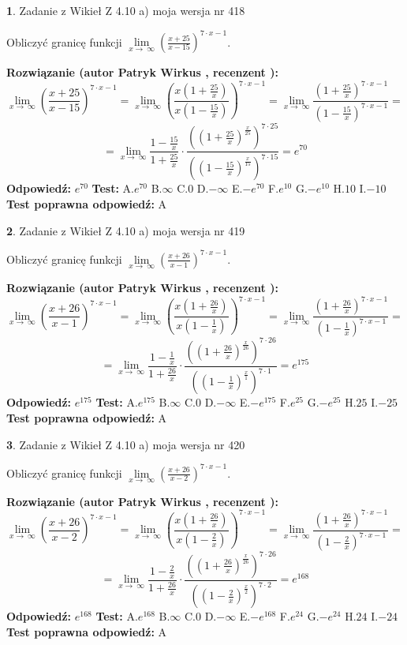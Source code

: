 \documentclass[12pt, a4paper]{article}
\theoremstyle{definition} %
\newtheorem{zad}{}
\newcommand{\zadStart}[1]{\begin{zad}#1\newline}
\newcommand{\zadStop}{\end{zad}}
\newcommand{\rozwStart}[2]{\noindent \textbf{Rozwiązanie (autor #1 , recenzent #2): }\newline}
\newcommand{\rozwStop}{\newline}
\newcommand{\odpStart}{\noindent \textbf{Odpowiedź:}\newline}
\newcommand{\odpStop}{\newline}
\newcommand{\testStart}{\noindent \textbf{Test:}\newline}
\newcommand{\testStop}{\newline}
\newcommand{\kluczStart}{\noindent \textbf{Test poprawna odpowiedź:}\newline}
\newcommand{\kluczStop}{\newline}
\begin{document}
\zadStart{Zadanie z Wikieł Z 4.10 a) moja wersja nr 418}

Obliczyć granicę funkcji  $\lim\limits_{x\to\ \infty}(\frac{x+25}{x-15})^{7\cdot x-1}$.
\zadStop
\rozwStart{Patryk Wirkus}{}
$$\lim\limits_{x\to\ \infty}(\frac{x+25}{x-15})^{7\cdot x-1} = \lim\limits_{x\to\ \infty}(\frac{x(1+\frac{25}{x})}{x(1-\frac{15}{x})})^{7\cdot x-1}=\lim\limits_{x\to\ \infty}\frac{(1+\frac{25}{x})^{7\cdot x-1}}{(1-\frac{15}{x})^{7\cdot x-1}}=$$
$$=\lim\limits_{x\to\ \infty}\frac{1-\frac{15}{x}}{1+\frac{25}{x}}\cdot\frac{((1+\frac{25}{x})^{\frac{x}{25}})^{7\cdot25}}{((1-\frac{15}{x})^{\frac{x}{15}})^{7\cdot15}}=e^{70}$$
\rozwStop
\odpStart
$e^{70}$
\odpStop
\testStart
A.$e^{70}$ B.$\infty$ C.$0$ D.$-\infty$ E.$-e^{70}$
F.$e^{10}$ G.$-e^{10}$
H.$10$
I.$-10$
\testStop
\kluczStart
A
\kluczStop



\zadStart{Zadanie z Wikieł Z 4.10 a) moja wersja nr 419}

Obliczyć granicę funkcji  $\lim\limits_{x\to\ \infty}(\frac{x+26}{x-1})^{7\cdot x-1}$.
\zadStop
\rozwStart{Patryk Wirkus}{}
$$\lim\limits_{x\to\ \infty}(\frac{x+26}{x-1})^{7\cdot x-1} = \lim\limits_{x\to\ \infty}(\frac{x(1+\frac{26}{x})}{x(1-\frac{1}{x})})^{7\cdot x-1}=\lim\limits_{x\to\ \infty}\frac{(1+\frac{26}{x})^{7\cdot x-1}}{(1-\frac{1}{x})^{7\cdot x-1}}=$$
$$=\lim\limits_{x\to\ \infty}\frac{1-\frac{1}{x}}{1+\frac{26}{x}}\cdot\frac{((1+\frac{26}{x})^{\frac{x}{26}})^{7\cdot26}}{((1-\frac{1}{x})^{\frac{x}{1}})^{7\cdot1}}=e^{175}$$
\rozwStop
\odpStart
$e^{175}$
\odpStop
\testStart
A.$e^{175}$ B.$\infty$ C.$0$ D.$-\infty$ E.$-e^{175}$
F.$e^{25}$ G.$-e^{25}$
H.$25$
I.$-25$
\testStop
\kluczStart
A
\kluczStop



\zadStart{Zadanie z Wikieł Z 4.10 a) moja wersja nr 420}

Obliczyć granicę funkcji  $\lim\limits_{x\to\ \infty}(\frac{x+26}{x-2})^{7\cdot x-1}$.
\zadStop
\rozwStart{Patryk Wirkus}{}
$$\lim\limits_{x\to\ \infty}(\frac{x+26}{x-2})^{7\cdot x-1} = \lim\limits_{x\to\ \infty}(\frac{x(1+\frac{26}{x})}{x(1-\frac{2}{x})})^{7\cdot x-1}=\lim\limits_{x\to\ \infty}\frac{(1+\frac{26}{x})^{7\cdot x-1}}{(1-\frac{2}{x})^{7\cdot x-1}}=$$
$$=\lim\limits_{x\to\ \infty}\frac{1-\frac{2}{x}}{1+\frac{26}{x}}\cdot\frac{((1+\frac{26}{x})^{\frac{x}{26}})^{7\cdot26}}{((1-\frac{2}{x})^{\frac{x}{2}})^{7\cdot2}}=e^{168}$$
\rozwStop
\odpStart
$e^{168}$
\odpStop
\testStart
A.$e^{168}$ B.$\infty$ C.$0$ D.$-\infty$ E.$-e^{168}$
F.$e^{24}$ G.$-e^{24}$
H.$24$
I.$-24$
\testStop
\kluczStart
A
\kluczStop
\end{document}

